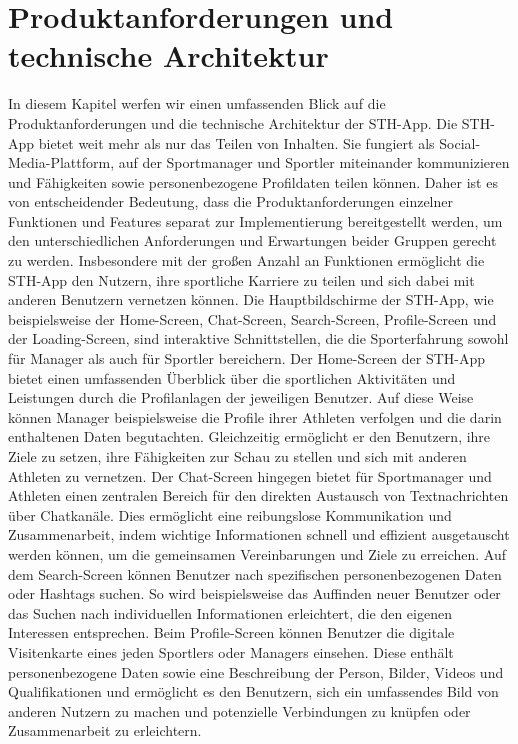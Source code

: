 \newpage
\chapter{Produktanforderungen und technische Architektur}

In diesem Kapitel werfen wir einen umfassenden Blick auf die Produktanforderungen und die technische Architektur der STH-App.
Die STH-App bietet weit mehr als nur das Teilen von Inhalten. Sie fungiert als Social-Media-Plattform, auf der Sportmanager und Sportler miteinander kommunizieren und Fähigkeiten sowie personenbezogene Profildaten teilen können. Daher ist es von entscheidender Bedeutung, dass die Produktanforderungen einzelner Funktionen und Features separat zur Implementierung bereitgestellt werden, um den unterschiedlichen Anforderungen und Erwartungen beider Gruppen gerecht zu werden.
Insbesondere mit der großen Anzahl an Funktionen ermöglicht die STH-App den Nutzern, ihre sportliche Karriere zu teilen und sich dabei mit anderen Benutzern vernetzen können.
Die Hauptbildschirme der STH-App, wie beispielsweise der Home-Screen, Chat-Screen, Search-Screen, Profile-Screen und der Loading-Screen, sind interaktive Schnittstellen, die die Sporterfahrung sowohl für Manager als auch für Sportler bereichern.
Der Home-Screen der STH-App bietet einen umfassenden Überblick über die sportlichen Aktivitäten und Leistungen durch die Profilanlagen der jeweiligen Benutzer. Auf diese Weise können Manager beispielsweise die Profile ihrer Athleten verfolgen und die darin enthaltenen Daten begutachten. Gleichzeitig ermöglicht er den Benutzern, ihre Ziele zu setzen, ihre Fähigkeiten zur Schau zu stellen und sich mit anderen Athleten zu vernetzen.
Der Chat-Screen hingegen bietet für Sportmanager und Athleten einen zentralen Bereich für den direkten Austausch von Textnachrichten über Chatkanäle. Dies ermöglicht eine reibungslose Kommunikation und Zusammenarbeit, indem wichtige Informationen schnell und effizient ausgetauscht werden können, um die gemeinsamen Vereinbarungen und Ziele zu erreichen.
Auf dem Search-Screen können Benutzer nach spezifischen personenbezogenen Daten oder Hashtags suchen. So wird beispielsweise das Auffinden neuer Benutzer oder das Suchen nach individuellen Informationen erleichtert, die den eigenen Interessen entsprechen.
Beim Profile-Screen können Benutzer die digitale Visitenkarte eines jeden Sportlers oder Managers einsehen. Diese enthält personenbezogene Daten sowie eine Beschreibung der Person, Bilder, Videos und Qualifikationen und ermöglicht es den Benutzern, sich ein umfassendes Bild von anderen Nutzern zu machen und potenzielle Verbindungen zu knüpfen oder Zusammenarbeit zu erleichtern.
